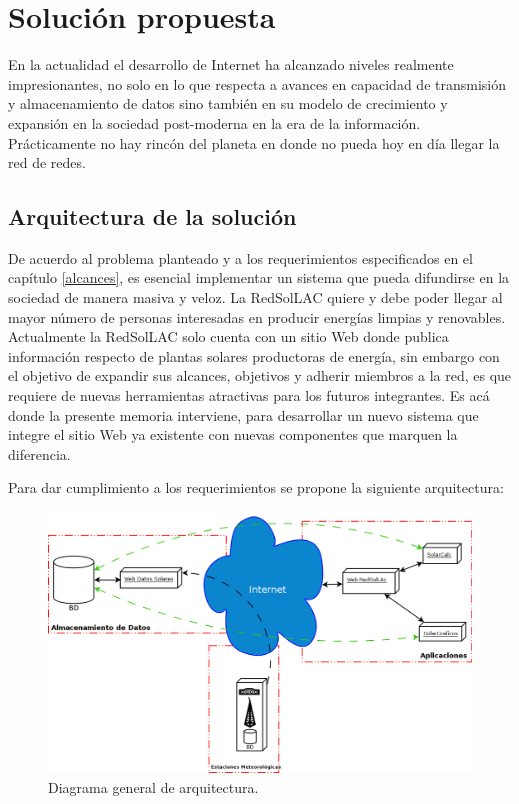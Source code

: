 \chapter{Solución propuesta}
\label{solucion}
En la actualidad el desarrollo de Internet ha alcanzado niveles realmente impresionantes, no solo en lo que respecta a avances en capacidad de transmisión y almacenamiento de datos sino también en su modelo de crecimiento y expansión en la sociedad post-moderna en la era de la información. Prácticamente no hay rincón del planeta en donde no pueda hoy en día llegar la red de redes\cite{iternet}.\\

\section{Arquitectura de la solución}
\label{arquitectura}
De acuerdo al problema planteado y a los requerimientos especificados en el capítulo \ref{alcances}, es esencial implementar un sistema que pueda difundirse en la sociedad de manera masiva y veloz. La RedSolLAC quiere y debe poder llegar al mayor número de personas interesadas en producir energías limpias y renovables.\\

Actualmente la RedSolLAC solo cuenta con un sitio Web donde publica información respecto de plantas solares productoras de energía, sin embargo con el objetivo de expandir sus alcances, objetivos y adherir miembros a la red, es que requiere de nuevas herramientas atractivas para los futuros integrantes. Es acá donde la presente memoria interviene, para desarrollar un nuevo sistema que integre el sitio Web ya existente con nuevas componentes que marquen la diferencia.

Para dar cumplimiento a los requerimientos se propone la siguiente arquitectura:

\begin{figure}[h!]
        \centering
        \includegraphics[width=400pt]{images/diagramaArquitectura}
        \caption{Diagrama general de arquitectura.}
	\label{da}
\end{figure}

